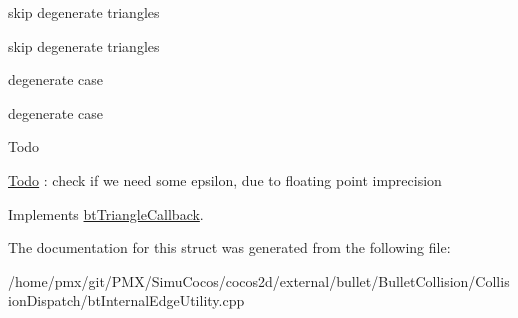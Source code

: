 skip degenerate triangles

skip degenerate triangles

degenerate case

degenerate case

\begin{DoxyRefDesc}{Todo}
\item[\hyperlink{todo__todo000014}{Todo}]\+: check if we need some epsilon, due to floating point imprecision \end{DoxyRefDesc}


Implements \hyperlink{classbtTriangleCallback}{bt\+Triangle\+Callback}.



The documentation for this struct was generated from the following file\+:\begin{DoxyCompactItemize}
\item 
/home/pmx/git/\+P\+M\+X/\+Simu\+Cocos/cocos2d/external/bullet/\+Bullet\+Collision/\+Collision\+Dispatch/bt\+Internal\+Edge\+Utility.\+cpp\end{DoxyCompactItemize}
